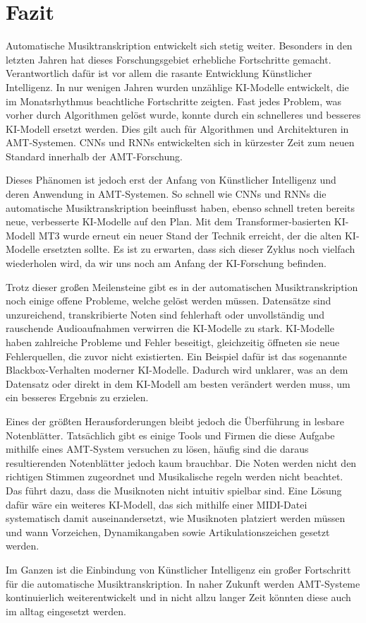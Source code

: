 \section{Fazit}
Automatische Musiktranskription entwickelt sich stetig weiter.
Besonders in den letzten Jahren hat dieses Forschungsgebiet erhebliche Fortschritte gemacht.
Verantwortlich dafür ist vor allem die rasante Entwicklung Künstlicher Intelligenz.
In nur wenigen Jahren wurden unzählige KI-Modelle entwickelt, die im Monatsrhythmus beachtliche Fortschritte zeigten.
Fast jedes Problem, was vorher durch Algorithmen gelöst wurde,
konnte durch ein schnelleres und besseres KI-Modell ersetzt werden.
Dies gilt auch für Algorithmen und Architekturen in AMT-Systemen.
CNNs und RNNs entwickelten sich in kürzester Zeit zum neuen Standard innerhalb der AMT-Forschung.

Dieses Phänomen ist jedoch erst der Anfang von Künstlicher Intelligenz und deren Anwendung in AMT-Systemen.
So schnell wie CNNs und RNNs die automatische Musiktranskription beeinflusst haben,
ebenso schnell treten bereits neue, verbesserte KI-Modelle auf den Plan.
Mit dem Transformer-basierten KI-Modell MT3 wurde erneut ein neuer Stand der Technik erreicht,
der die alten KI-Modelle ersetzten sollte.
Es ist zu erwarten, dass sich dieser Zyklus noch vielfach wiederholen wird,
da wir uns noch am Anfang der KI-Forschung befinden.

Trotz dieser großen Meilensteine gibt es in der automatischen Musiktranskription noch einige offene Probleme,
welche gelöst werden müssen.
Datensätze sind unzureichend, transkribierte Noten sind fehlerhaft oder unvollständig
und rauschende Audioaufnahmen verwirren die KI-Modelle zu stark.
KI-Modelle haben zahlreiche Probleme und Fehler beseitigt,
gleichzeitig öffneten sie neue Fehlerquellen, die zuvor nicht existierten.
Ein Beispiel dafür ist das sogenannte Blackbox-Verhalten moderner KI-Modelle.
Dadurch wird unklarer, was an dem Datensatz oder direkt in dem KI-Modell am besten verändert werden muss,
um ein besseres Ergebnis zu erzielen.

Eines der größten Herausforderungen bleibt jedoch die Überführung in lesbare Notenblätter.
Tatsächlich gibt es einige Tools und Firmen die diese Aufgabe mithilfe eines AMT-System versuchen zu lösen,
häufig sind die daraus resultierenden Notenblätter jedoch kaum brauchbar.
Die Noten werden nicht den richtigen Stimmen zugeordnet und Musikalische regeln werden nicht beachtet.
Das führt dazu, dass die Musiknoten nicht intuitiv spielbar sind.
Eine Lösung dafür wäre ein weiteres KI-Modell,
das sich mithilfe einer MIDI-Datei systematisch damit auseinandersetzt,
wie Musiknoten platziert werden müssen und wann Vorzeichen, Dynamikangaben sowie Artikulationszeichen gesetzt werden.

Im Ganzen ist die Einbindung von Künstlicher Intelligenz ein großer Fortschritt für die automatische Musiktranskription.
In naher Zukunft werden AMT-Systeme kontinuierlich weiterentwickelt
und in nicht allzu langer Zeit könnten diese auch im alltag eingesetzt werden.
